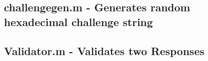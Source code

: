\newpage

\subsection{challengegen.m - Generates random hexadecimal challenge string}



\subsection{Validator.m - Validates two Responses}

